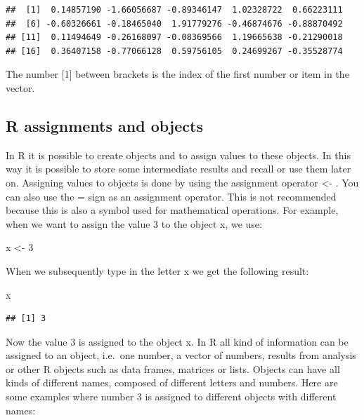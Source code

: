 \documentclass[]{book}
\newenvironment{Shaded}{\begin{snugshade}}{\end{snugshade}}
\newcommand{\DecValTok}[1]{\textcolor[rgb]{0.00,0.00,0.81}{#1}}
\newcommand{\StringTok}[1]{\textcolor[rgb]{0.31,0.60,0.02}{#1}}
\newcommand{\NormalTok}[1]{#1}
\begin{document}
\begin{verbatim}
##  [1]  0.14857190 -1.66056687 -0.89346147  1.02328722  0.66223111
##  [6] -0.60326661 -0.18465040  1.91779276 -0.46874676 -0.88870492
## [11]  0.11494649 -0.26168097 -0.08369566  1.19665638 -0.21290018
## [16]  0.36407158 -0.77066128  0.59756105  0.24699267 -0.35528774
\end{verbatim}

The number {[}1{]} between brackets is the index of the first number or
item in the vector.

\subsection{R assignments and objects}\label{r-assignments-and-objects}

In R it is possible to create objects and to assign values to these
objects. In this way it is possible to store some intermediate results
and recall or use them later on. Assigning values to objects is done by
using the assignment operator \textless{}- . You can also use the = sign
as an assignment operator. This is not recommended because this is also
a symbol used for mathematical operations. For example, when we want to
assign the value 3 to the object x, we use:

\begin{Shaded}
\begin{Highlighting}[]
\NormalTok{x <-}\StringTok{ }\DecValTok{3} 
\end{Highlighting}
\end{Shaded}

When we subsequently type in the letter x we get the following result:

\begin{Shaded}
\begin{Highlighting}[]
\NormalTok{x }
\end{Highlighting}
\end{Shaded}

\begin{verbatim}
## [1] 3
\end{verbatim}

Now the value 3 is assigned to the object x. In R all kind of
information can be assigned to an object, i.e.~one number, a vector of
numbers, results from analysis or other R objects such as data frames,
matrices or lists. Objects can have all kinds of different names,
composed of different letters and numbers. Here are some examples where
number 3 is assigned to different objects with different names:
\end{document}
